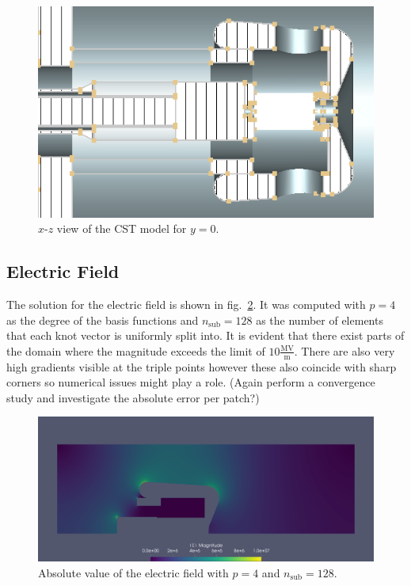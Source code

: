 \begin{center}
\begin{figure}[H]
  \includegraphics[width=\textwidth]{figures/200kV/v1_cuty}
  \caption{$x$-$z$ view of the CST model for $y=0$.}
  \label{fig:cst_geometry_xz}
\end{figure}
\end{center}

\subsection{Electric Field}
The solution for the electric field is shown in fig.~\ref{fig:200kV_electric_field}.
It was computed with $p=4$ as the degree of the basis functions and $n_\mathrm{sub}=128$ as the number of elements that each knot vector is uniformly split into.
It is evident that there exist parts of the domain where the magnitude exceeds the limit of $10 \frac{\mathrm{MV}}{\mathrm{m}}$. There are also very high gradients visible at the triple points however these also coincide with sharp corners so numerical issues might play a role. (Again perform a convergence study and investigate the absolute error per patch?)

\begin{center}
\begin{figure}[H]
  \includegraphics[width=\textwidth]{figures/200kV/gradient_degree=4_nsub=128}
  \caption{Absolute value of the electric field with $p=4$ and $n_\mathrm{sub}=128$.}
  \label{fig:200kV_electric_field}
\end{figure}
\end{center}

